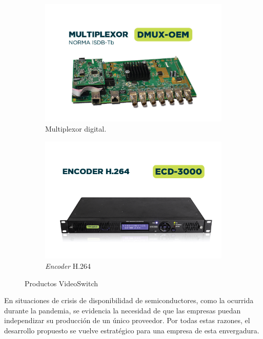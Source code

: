 \vspace{1cm}
\begin{figure}[htbp]
    \centering
    \begin{subfigure}{.45\linewidth}
        \includegraphics[width=\linewidth]{./Figures/DMUX-OEM.jpg}
        \caption{Multiplexor digital.}
    \end{subfigure}
    \hspace{.05\linewidth}
    \begin{subfigure}{.45\linewidth}
        \includegraphics[width=\linewidth]{./Figures/ECD-3000.png}
        \caption{\textit{Encoder} H.264}
    \end{subfigure}
    \caption{Productos VideoSwitch}\label{fig:vs-mux-ecd}
\end{figure}
\vspace{1cm}

En situaciones de crisis de disponibilidad de semiconductores, como la ocurrida
durante la pandemia, se evidencia la necesidad de que las empresas puedan
independizar su producción de un único proveedor. Por todas estas razones, el
desarrollo propuesto se vuelve estratégico para una empresa de esta envergadura.
